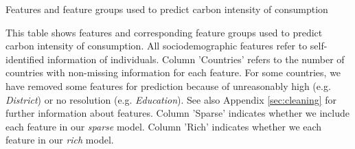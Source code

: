 \begin{table}[ht!]
\begin{adjustbox}{width=1\textwidth}
\end{adjustbox}
  \caption{Features and feature groups used to predict carbon intensity of consumption}
  \label{tab:features}

\begin{subcaption2}
This table shows features and corresponding feature groups used to predict carbon intensity of consumption. All sociodemographic features refer to self-identified information of individuals. Column 'Countries' refers to the number of countries with non-missing information for each feature. For some countries, we have removed some features for prediction because of unreasonably high (e.g. \textit{District}) or no resolution (e.g. \textit{Education}). See also Appendix \ref{sec:cleaning} for further information about features. Column 'Sparse' indicates whether we include each feature in our \textit{sparse} model. Column 'Rich' indicates whether we each feature in our \textit{rich} model.
\end{subcaption2}

\end{table}